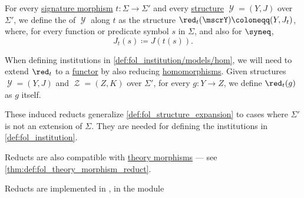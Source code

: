 \begin{definition}\label{def:fol_reduct_along_morphism}
  For every \hyperref[def:fol_signature_category/morphisms]{signature morphism} \( t: \Sigma \to \Sigma' \) and every \hyperref[def:fol_structure]{structure} \( \mscrY = (Y, J) \) over \( \Sigma' \), we define the  of \( \mscrY \) along \( t \) as the structure \( \red_t(\mscrY) \coloneqq (Y, J_t) \), where, for every function or predicate symbol \( s \) in \( \Sigma \), and also for \( {\syneq} \),
  \begin{equation}\label{eq:def:fol_reduct_along_morphism/interpretation}
    J_t(s) \coloneqq J(t(s)).
  \end{equation}

  When defining institutions in \cref{def:fol_institution/models/hom}, we will need to extend \( \red_t \) to a \hyperref[def:functor]{functor} by also reducing \hyperref[def:fol_homomorphism]{homomorphisms}. Given structures \( \mscrY = (Y, J) \) and \( \mscrZ = (Z, K) \) over \( \Sigma' \), for every \( g: Y \to Z \), we define \( \red_t(g) \) as \( g \) itself.
\end{definition}
\begin{comments}
  \item These induced reducts generalize \cref{def:fol_structure_expansion} to cases where \( \Sigma' \) is not an extension of \( \Sigma \). They are needed for defining the institutions in \cref{def:fol_institution}.

  \item Reducts are also compatible with \hyperref[def:fol_theory/morphism]{theory morphisms} --- see \cref{thm:def:fol_theory_morphism_reduct}.

  \item Reducts are implemented in \cite{notebook:code}, in the module
  \begin{CodeRefDisplay}
  \end{CodeRefDisplay}
\end{comments}

